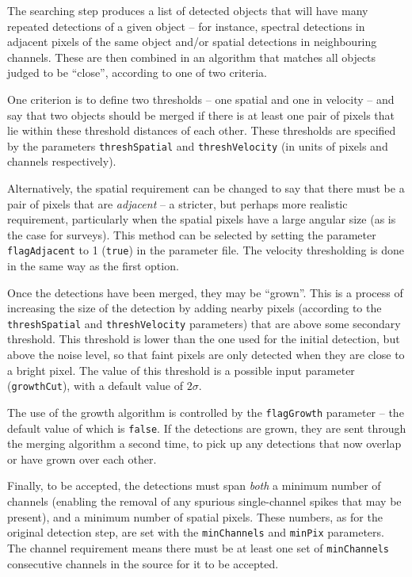 \label{sec-merger}

The searching step produces a list of detected objects that will have
many repeated detections of a given object -- for instance, spectral
detections in adjacent pixels of the same object and/or spatial
detections in neighbouring channels. These are then combined in an
algorithm that matches all objects judged to be ``close'', according
to one of two criteria.

One criterion is to define two thresholds -- one spatial and one in
velocity -- and say that two objects should be merged if there is at
least one pair of pixels that lie within these threshold distances of
each other. These thresholds are specified by the parameters
\texttt{threshSpatial} and \texttt{threshVelocity} (in units of pixels
and channels respectively).

Alternatively, the spatial requirement can be changed to say that
there must be a pair of pixels that are \emph{adjacent} -- a stricter,
but perhaps more realistic requirement, particularly when the spatial
pixels have a large angular size (as is the case for 
\hi surveys). This 
method can be selected by setting the parameter
\texttt{flagAdjacent} to 1 (\ie \texttt{true}) in the parameter
file. The velocity thresholding is done in the same way as the first
option.

Once the detections have been merged, they may be ``grown''. This is a
process of increasing the size of the detection by adding nearby
pixels (according to the \texttt{threshSpatial} and
\texttt{threshVelocity} parameters) that are above some secondary
threshold. This threshold is lower than the one used for the initial
detection, but above the noise level, so that faint pixels are only
detected when they are close to a bright pixel. The value of this
threshold is a possible input parameter (\texttt{growthCut}), with a
default value of $2\sigma$.

The use of the growth algorithm is controlled by the
\texttt{flagGrowth} parameter -- the default value of which is
\texttt{false}. If the detections are grown, they are sent through the
merging algorithm a second time, to pick up any detections that now
overlap or have grown over each other.

Finally, to be accepted, the detections must span \emph{both} a
minimum number of channels (enabling the removal of any spurious
single-channel spikes that may be present), and a minimum number of
spatial pixels. These numbers, as for the original detection step, are
set with the \texttt{minChannels} and \texttt{minPix} parameters. The
channel requirement means there must be at least one set of
\texttt{minChannels} consecutive channels in the source for it to be
accepted.
